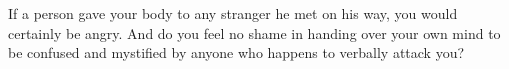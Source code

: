 If  a person  gave your  body to  any stranger  he met  on his  way, you  would
certainly be angry. And  do you feel no shame in handing over  your own mind to
be confused and mystified by anyone who happens to verbally attack you?
